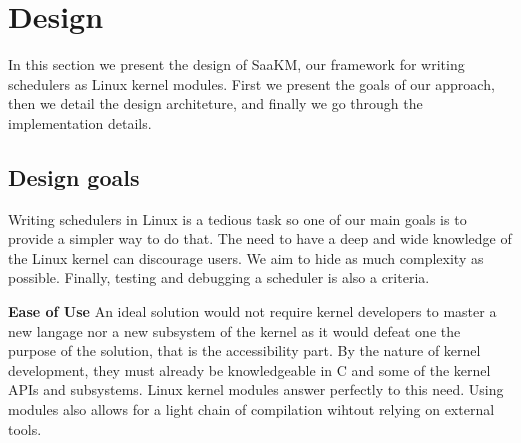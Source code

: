 
\section{Design}

\label{sec:scheduler-as-a-kernel-module}



In this section we present the design of SaaKM, our framework for writing schedulers as Linux kernel modules. First we present the goals of our approach, then we detail the design architeture, and finally we go through the implementation details.

\subsection{Design goals} Writing schedulers in Linux is a tedious task so one of our main goals is to provide a simpler way to do that. The need to have a deep and wide knowledge of the Linux kernel can discourage users. We aim to hide as much complexity as possible. Finally, testing and debugging a scheduler is also a criteria.

\textbf{Ease of Use} An ideal solution would not require kernel developers to master a new langage nor a new subsystem of the kernel as it would defeat one the purpose of the solution, that is the accessibility part. By the nature of kernel development, they must already be knowledgeable in C and some of the kernel APIs and subsystems. Linux kernel modules answer perfectly to this need. Using modules also allows for a light chain of compilation wihtout relying on external tools.


